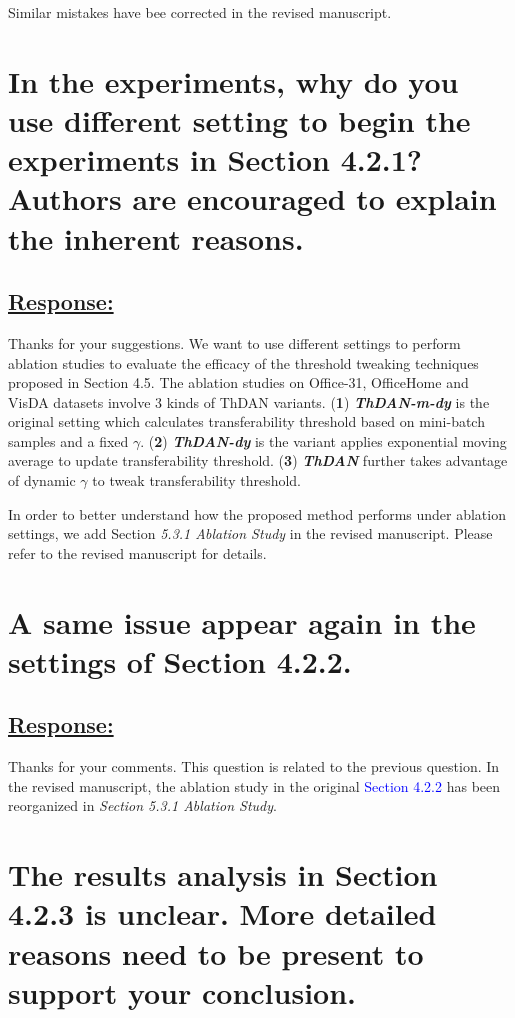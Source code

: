 {Similar mistakes have bee corrected in the revised manuscript.


\section{In the experiments, why do you use different setting to begin the experiments in Section 4.2.1? Authors are encouraged to explain the inherent reasons.}
\subsection*{\underline{\textbf{Response:}}}

Thanks for your suggestions.
We want to use different settings to perform ablation studies to evaluate the efficacy of the threshold tweaking techniques proposed in Section 4.5.
The ablation studies on Office-31, OfficeHome and VisDA datasets involve 3 kinds of ThDAN variants.
(\textbf{1}) \textit{\textbf{ThDAN-m-dy}} is the original setting which calculates transferability threshold based on mini-batch samples and a fixed $\gamma$.
(\textbf{2}) \textit{\textbf{ThDAN-dy}} is the variant applies exponential moving average to update transferability threshold.
(\textbf{3}) \textit{\textbf{ThDAN}} further takes advantage of dynamic $\gamma$ to tweak transferability threshold.

In order to better understand how the proposed method performs under ablation settings, we add Section \textit{5.3.1 Ablation Study} in the revised manuscript.
Please refer to the revised manuscript for details.


\section{A same issue appear again in the settings of Section 4.2.2.}
\subsection*{\underline{\textbf{Response:}}}

Thanks for your comments.
This question is related to the previous question.
In the revised manuscript, the ablation study in the original \textcolor{blue}{Section 4.2.2} has been reorganized in \textit{Section 5.3.1 Ablation Study}.


\section{The results analysis in Section 4.2.3 is unclear. More detailed reasons need to be present to support your conclusion.}
}
